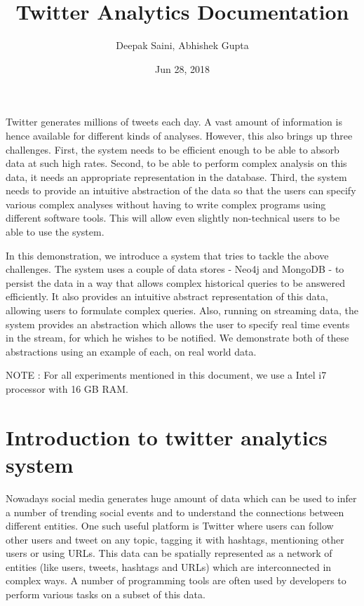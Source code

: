 \documentclass[letterpaper,10pt,english]{sphinxmanual}
\title{Twitter Analytics Documentation}
\date{Jun 28, 2018}
\author{Deepak Saini, Abhishek Gupta}
\begin{document}
\maketitle
\sphinxtableofcontents
{}\label{\detokenize{index::doc}}


Twitter generates millions of tweets each day. A vast amount of information is hence available for different kinds of analyses. However, this also brings up three challenges. First, the system needs to be efficient enough to be able to absorb data at such high rates. Second, to be able to perform complex analysis on this data, it needs an appropriate representation in the database. Third, the system needs to provide an intuitive abstraction of the data so that the users can specify various complex analyses without having to write complex programs using different software tools. This will allow even slightly non-technical users to be able to use the system.

In this demonstration, we introduce a system that tries to tackle the above challenges. The system uses a couple of data stores - Neo4j and MongoDB - to persist the data in a way that allows complex historical queries to be answered efficiently. It also provides an intuitive abstract representation of this data, allowing users to formulate complex queries. Also, running on streaming data, the system provides an abstraction which allows the user to specify real time events in the stream, for which he wishes to be notified. We demonstrate both of these abstractions using an example of each, on real world data.

NOTE : For all experiments mentioned in this document, we use a Intel i7 processor with 16 GB RAM.


\chapter{Introduction to twitter analytics system}
\label{\detokenize{introduction:welcome-to-twitter-analytics-documentation}}\label{\detokenize{introduction:introduction-to-twitter-analytics-system}}\label{\detokenize{introduction::doc}}
Nowadays social media generates huge amount of data which can be used to infer a number of trending social events and to understand the connections between different entities. One such useful platform is Twitter where users can follow other users and tweet on any topic, tagging it with hashtags, mentioning other users or using URLs. This data can be spatially represented as a network of entities (like users, tweets, hashtags and URLs) which are interconnected in complex ways. A number of programming tools are often used by developers to perform various tasks on a subset of this data.
\end{document}
